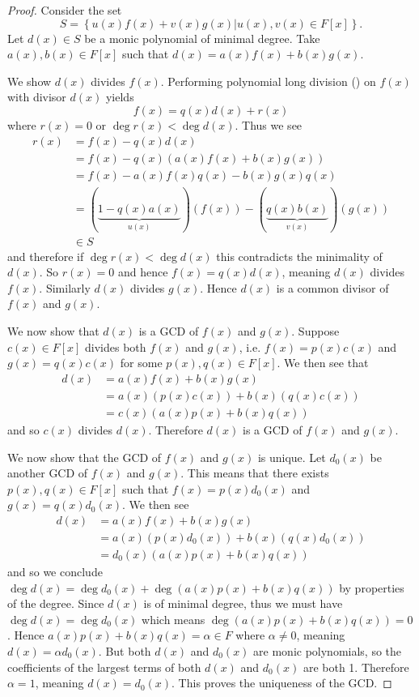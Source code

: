 \begin{proof}
    Consider the set
    \[
        S = \left\{u(x)f(x) + v(x)g(x) \vert u(x), v(x) \in F[x]\right\}.
    \]
    Let $d(x) \in S$ be a monic polynomial of minimal degree. Take $a(x),b(x) \in F[x]$ such that $d(x) = a(x)f(x) + b(x)g(x)$.

    We show $d(x)$ divides $f(x)$. Performing polynomial long division () on $f(x)$ with divisor $d(x)$ yields
    \[
        f(x) = q(x)d(x) + r(x)
    \]
    where $r(x) = 0$ or $\deg r(x) < \deg d(x)$. Thus we see
    \begin{align*}
        r(x) &= f(x) - q(x)d(x)\\
        &= f(x)-q(x)\left(a(x)f(x) + b(x)g(x)\right)\\
        &= f(x) - a(x)f(x)q(x) - b(x)g(x)q(x)\\
        &= (\underbrace{1 - q(x)a(x)}_{u(x)})(f(x)) - (\underbrace{q(x)b(x)}_{v(x)})(g(x))\\
        &\in S
    \end{align*}
    and therefore if $\deg r(x) < \deg d(x)$ this contradicts the minimality of $d(x)$. So $r(x) = 0$ and hence $f(x) = q(x)d(x)$, meaning $d(x)$ divides $f(x)$. Similarly $d(x)$ divides $g(x)$. Hence $d(x)$ is a common divisor of $f(x)$ and $g(x)$.

    We now show that $d(x)$ is a GCD of $f(x)$ and $g(x)$. Suppose $c(x) \in F[x]$ divides both $f(x)$ and $g(x)$, i.e. $f(x) = p(x)c(x)$ and $g(x) = q(x)c(x)$ for some $p(x), q(x) \in F[x]$. We then see that
    \begin{align*}
        d(x) &= a(x)f(x) + b(x)g(x)\\
        &= a(x)(p(x)c(x)) + b(x)(q(x)c(x))\\
        &= c(x)(a(x)p(x) + b(x)q(x))
    \end{align*}
    and so $c(x)$ divides $d(x)$. Therefore $d(x)$ is a GCD of $f(x)$ and $g(x)$.

    We now show that the GCD of $f(x)$ and $g(x)$ is unique. Let $d_0(x)$ be another GCD of $f(x)$ and $g(x)$. This means that there exists $p(x), q(x) \in F[x]$ such that $f(x) = p(x)d_0(x)$ and $g(x) = q(x)d_0(x)$. We then see
    \begin{align*}
        d(x) &= a(x)f(x) + b(x)g(x)\\
        &= a(x)(p(x)d_0(x)) + b(x)(q(x)d_0(x))\\
        &= d_0(x)(a(x)p(x) + b(x)q(x))
    \end{align*}
    and so we conclude $\deg d(x) = \deg d_0(x) + \deg\left(a(x)p(x) + b(x)q(x)\right)$ by properties of the degree. Since $d(x)$ is of minimal degree, thus we must have $\deg d(x) = \deg d_0(x)$ which means $\deg\left(a(x)p(x) + b(x)q(x)\right) = 0$. Hence $a(x)p(x) + b(x)q(x) = \alpha \in F$ where $\alpha \neq 0$, meaning $d(x) = \alpha d_0(x)$. But both $d(x)$ and $d_0(x)$ are monic polynomials, so the coefficients of the largest terms of both $d(x)$ and $d_0(x)$ are both 1. Therefore $\alpha = 1$, meaning $d(x) = d_0(x)$. This proves the uniqueness of the GCD.
\end{proof}

